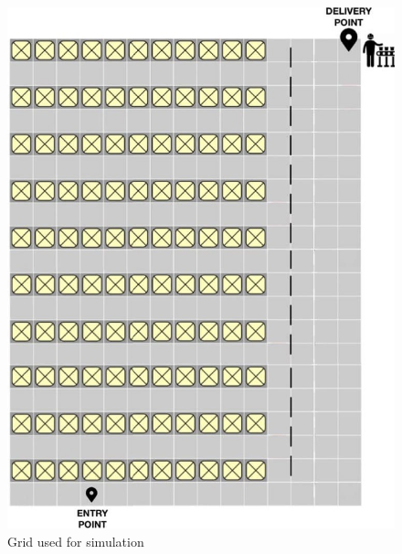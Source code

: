 \documentclass[10pt,a4paper]{article}
\begin{document}
			\begin{figure}[H]
				\centering
					\includegraphics[scale = 0.34]{Images/Grid.jpg}
					\caption{Grid used for simulation}
			\end{figure}

		
		
\end{document}
